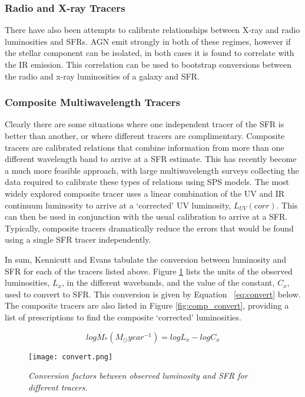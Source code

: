 \documentclass{literature}
\begin{document}
\subsubsection{Radio and X-ray Tracers}\label{subsubsec:rad_x}
There have also been attempts to calibrate relationships between X-ray and radio luminosities and SFRs. AGN emit strongly in both of these regimes, however if the stellar component can be isolated, in both cases it is found to correlate with the IR emission. This correlation can be used to bootstrap conversions between the radio and x-ray luminosities of a galaxy and SFR.

\subsubsection{Composite Multiwavelength Tracers}\label{subsubsec:comp}
Clearly there are some situations where one independent tracer of the SFR is better than another, or where different tracers are complimentary. Composite tracers are calibrated relations that combine information from more than one different wavelength band to arrive at a SFR estimate. This has recently become a much more feasible approach, with large multiwavelength surveys collecting the data required to calibrate these types of relations using SPS models. The most widely explored composite tracer uses a linear combination of the UV and IR continuum luminosity to arrive at a `corrected' UV luminosity, $L_{UV}(corr)$. This can then be used in conjunction with the usual calibration to arrive at a SFR. Typically, composite tracers dramatically reduce the errors that would be found using a single SFR tracer independently.   


In sum, Kennicutt and Evans \citep{Kennicutt_2012} tabulate the conversion between luminosity and SFR for each of the tracers listed above. Figure \ref{fig:convert} lists the units of the observed luminosities, $L_{x}$, in the different wavebands, and the value of the constant, $C_{x}$, used to convert to SFR. This conversion is given by Equation ~\ref{eq:convert} below. The composite tracers are also listed in Figure \ref{fig:comp_convert}, providing a list of prescriptions to find the composite `corrected' luminosities. 

\begin{equation} \label{eq:convert}	
	log\dot{M_{*}}(M_{\odot}year^{-1}) = logL_{x} - logC_{x}
\end{equation}


\begin{figure}[!htp]
\centering
\texttt{[image: convert.png]}
\caption{\footnotesize{\emph{Conversion factors between observed luminosity and SFR for different tracers.}}}
\label{fig:convert}
\end{figure} 
\end{document}
